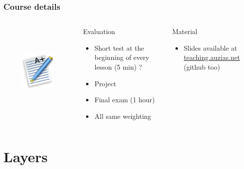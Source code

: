 \documentclass{beamer}
\begin{document}
  \begin{frame}
    \frametitle{Course details}
    \begin{columns}
        \begin{figure}[t]
          \centering
          \includegraphics[height=4cm]{./imgs/grade.pdf}
          \label{fig:marks}
        \end{figure}
        \begin{block}{Evaluation}
          \begin{itemize}
            \item Short test at the beginning of every lesson (5 min) ?
            \item Project
            \item Final exam (1 hour)
            \item All same weighting
          \end{itemize}
        \end{block}
        \begin{block}{Material}
          \begin{itemize}
            \item Slides available at \color{blue}\href{http://teaching.auzias.net}{teaching.auzias.net} \color{black} (github too)
          \end{itemize}
        \end{block}
    \end{columns}
  \end{frame}



\section{Layers}





%    
\end{document}
